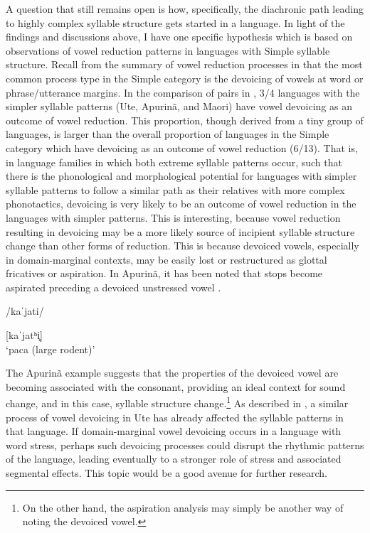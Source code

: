   A question that still remains open is how, specifically, the diachronic path leading to highly complex syllable structure gets started in a language. In light of the findings and discussions above, I have one specific hypothesis which is based on observations of vowel reduction patterns in languages with Simple syllable structure. Recall from the summary of vowel reduction processes in  that the most common process type in the Simple category is the devoicing of vowels at word or phrase/utterance margins. In the comparison of pairs in , 3/4 languages with the simpler syllable patterns (Ute, Apurinã, and Maori) have vowel devoicing as an outcome of vowel reduction. This proportion, though derived from a tiny group of languages, is larger than the overall proportion of languages in the Simple category which have devoicing as an outcome of vowel reduction (6/13). That is, in language families in which both extreme syllable patterns occur, such that there is the phonological and morphological potential for languages with simpler syllable patterns to follow a similar path as their relatives with more complex phonotactics, devoicing is very likely to be an outcome of vowel reduction in the languages with simpler patterns. This is interesting, because vowel reduction resulting in devoicing may be a more likely source of incipient syllable structure change than other forms of reduction. This is because devoiced vowels, especially in domain-marginal contexts, may be easily lost or restructured as glottal fricatives or aspiration. In Apurinã, it has been noted that stops become aspirated preceding a devoiced unstressed vowel .

\ea\label{ex:8.6}

/kaˈjati/

[kaˈjatʰi̥]\\
\glt ‘paca (large rodent)’
\citep[60-1]{Facundes2000} 
\z

  The Apurinã example suggests that the properties of the devoiced vowel are becoming associated with the consonant, providing an ideal context for sound change, and in this case, syllable structure change.\footnote{{On the other hand, the aspiration analysis may simply be another way of noting the devoiced vowel.}} As described in , a similar process of vowel devoicing in Ute has already affected the syllable patterns in that language. If domain-marginal vowel devoicing occurs in a language with word stress, perhaps such devoicing processes could disrupt the rhythmic patterns of the language, leading eventually to a stronger role of stress and associated segmental effects. This topic would be a good avenue for further research.

